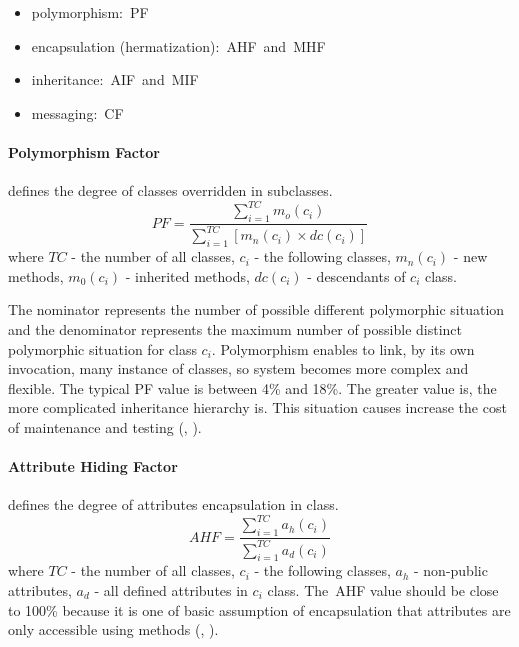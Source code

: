 \begin{itemize}\addtolength{\itemsep}{-0.5\baselineskip}\vspace{-7mm}
\item  polymorphism:~\ac{PF}
\item encapsulation (hermatization):~\ac{AHF}~and~\ac{MHF}
\item inheritance:~\ac{AIF}~and~\ac{MIF}
\item messaging:~\ac{CF}
\end{itemize}\vspace{-10mm}

\paragraph{Polymorphism Factor} defines the degree of classes overridden in subclasses.
\begin{equation}
PF=\frac { \sum _{ i=1 }^{ TC }{ { m }_{ o }({ c }_{ i }) }  }{ \sum _{ i=1 }^{ TC }{ \left[ { m }_{ n }({ c }_{ i })\times dc({ c }_{ i }) \right]  }  } 
\end{equation}
where $TC$ - the number of all classes, $c_{i}$ - the following classes, $m_{n}(c_{i})$ - new methods, $m_{0}(c_{i})$ - inherited methods, $dc(c_{i})$ - descendants of $c_{i}$ class. 

The nominator represents the number of possible different polymorphic situation
and the denominator represents the maximum number of possible distinct polymorphic
situation for class $c_{i}$. Polymorphism enables to link, by its own invocation, many instance of classes, so system becomes more complex and flexible. The typical \ac{PF} value is between 4\% and 18\%. The greater value is, the more complicated inheritance hierarchy is. This situation causes increase the cost of maintenance and testing (\cite{moodbook}, \cite{nasa}). 

\paragraph{Attribute Hiding Factor} defines the degree of attributes encapsulation in class.
\begin{equation}
AHF=\frac { \sum _{ i=1 }^{ TC }{ { a }_{ h }({ c }_{ i }) }  }{ \sum _{ i=1 }^{ TC }{ { a }_{ d }({ c }_{ i }) }  }
\end{equation}
where $TC$ - the number of all classes, $c_{i}$ - the following classes, $a_{h}$ - non-public attributes, $a_{d}$ - all defined attributes in $c_{i}$ class. The~\ac{AHF} value should be close to 100\% because it is one of basic assumption of encapsulation that attributes are only accessible using methods (\cite{moodbook}, \cite{nasa}).

